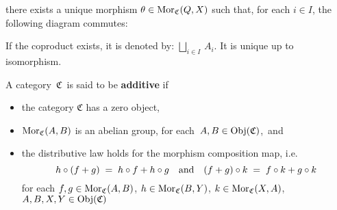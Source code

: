\begin{definition}
\begin{itemize}
	there exists a unique morphism $\theta \in \textnormal{Mor}_{\mathfrak{C}}(Q,X)$ such that,
	for each $i \in I$, the following diagram commutes:
	\begin{center}
	\end{center}
	If the coproduct exists, it is denoted by: $\underset{i \in I}{\bigsqcup}\,A_{i}$.
	It is unique up to isomorphism.
\end{itemize}
\end{definition}


\vskip 0.5cm
\begin{definition}
\mbox{}
\vskip 0.15cm
\noindent
A category \,$\mathfrak{C}$\, is said to be \textbf{additive} if
\begin{itemize}
\item
	the category $\mathfrak{C}$ has a zero object,
\item
	$\textnormal{Mor}_{\mathfrak{C}}(A,B)$ is an abelian group, for each \,$A, B \in \textnormal{Obj}(\mathfrak{C})$,\, and
\item
	the distributive law holds for the morphism composition map, i.e.
	\begin{equation*}
	h \circ (f + g) \; = \; h \circ f + h \circ g
	\quad\textnormal{and}\quad
	(f + g) \circ k \; = \; f \circ k + g \circ k
	\end{equation*}
	for each
	$f, g \in \textnormal{Mor}_{\mathfrak{C}}(A,B)$,
	$h \in \textnormal{Mor}_{\mathfrak{C}}(B,Y)$,
	$k \in \textnormal{Mor}_{\mathfrak{C}}(X,A)$,
	$A, B, X, Y \in \textnormal{Obj}(\mathfrak{C})$
\end{itemize}
\end{definition}


